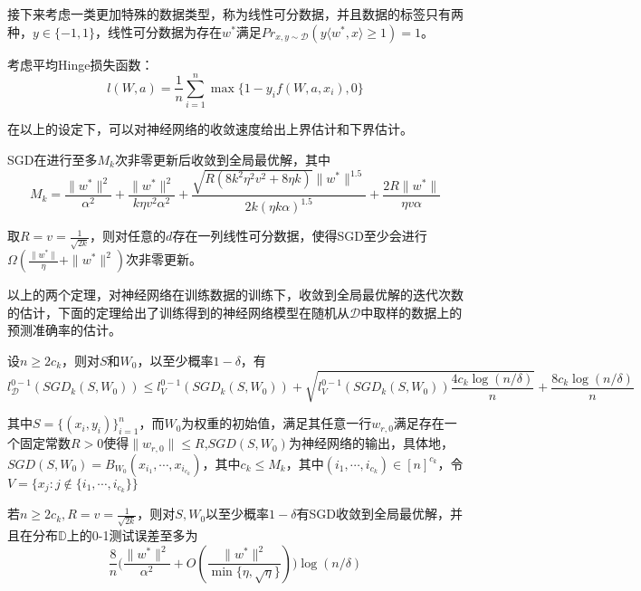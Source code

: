 \par
接下来考虑一类更加特殊的数据类型，称为线性可分数据，并且数据的标签只有两种，$y\in \{-1,1\}$，线性可分数据为存在$w^*$满足$Pr_{x,y\sim \mathcal{D}}(y\langle w^*, x\rangle\geq 1) = 1$。
\par
考虑平均Hinge损失函数：
\[
l(W,a) = \frac{1}{n}\sum_{i=1}^n \max\{1-y_if(W,a,x_i),0\}
\]
\par
在以上的设定下，可以对神经网络的收敛速度给出上界估计和下界估计\cite{brutzkus2017sgd}。
\begin{theorem}[上界]
SGD在进行至多$M_k$次非零更新后收敛到全局最优解，其中
\[
M_k = \frac{\|w^*\|^2}{\alpha^2}+\frac{\|w^*\|^2}{k\eta v^2\alpha^2}+\frac{\sqrt{R(8k^2\eta^2v^2+8\eta k)}\|w^*\|^{1.5}}{2k(\eta k \alpha)^{1.5}} + \frac{2R\|w^*\|}{\eta v\alpha}
\]
\end{theorem}
\begin{theorem}[下界]
取$R = v = \frac{1}{\sqrt{2k}}$，则对任意的$d$存在一列线性可分数据，使得SGD至少会进行$\Omega(\frac{\|w^*\|}{\eta}+\|w^*\|^2)$次非零更新。
\end{theorem}
\par
以上的两个定理，对神经网络在训练数据的训练下，收敛到全局最优解的迭代次数的估计，下面的定理给出了训练得到的神经网络模型在随机从$\mathcal{D}$中取样的数据上的预测准确率的估计。
\begin{theorem}
设$n\geq 2c_k$，则对$S$和$W_0$，以至少概率$1-\delta$，有
\[
l_{\mathcal{D}}^{0-1}(SGD_k(S,W_0))\leq l_{V}^{0-1}(SGD_k(S,W_0)) + \sqrt{l_{V}^{0-1}(SGD_k(S,W_0))\frac{4c_k\log(n/\delta)}{n}} + \frac{8c_k\log(n/\delta)}{n}
\]
\par
其中$S = \{(x_i,y_i)\}_{i=1}^n$，而$W_0$为权重的初始值，满足其任意一行$w_{r,0}$满足存在一个固定常数$R>0$使得$\|w_{r,0}\|\leq R$,$SGD(S,W_0)$为神经网络的输出，具体地，$SGD(S,W_0) = B_{W_0}(x_{i_1},\cdots,x_{i_{c_k}})$，其中$c_k\leq M_k$，其中$(i_1,\cdots,i_{c_k})\in [n]^{c_k}$，令$V = \{x_j:j\notin \{i_1,\cdots,i_{c_k}\}\}$
\end{theorem}

\begin{theorem}
若$n\geq 2c_k, R = v = \frac{1}{\sqrt{2k}}$，则对$S,W_0$以至少概率$1-\delta$有SGD收敛到全局最优解，并且在分布$\mathbb{D}$上的0-1测试误差至多为
\[
\frac{8}{n}\big(\frac{\|w^*\|^2}{\alpha^2}+O(\frac{\|w^*\|^2}{\min\{\eta,\sqrt{\eta}\}})\big)\log(n/\delta)
\]

\end{theorem}


